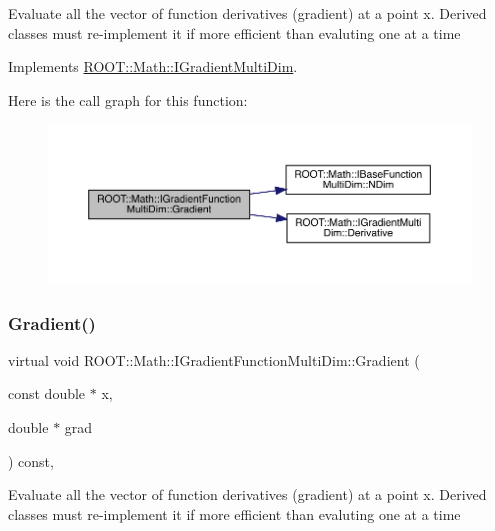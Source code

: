 Evaluate all the vector of function derivatives (gradient) at a point x. Derived classes must re-\/implement it if more efficient than evaluting one at a time 

Implements \mbox{\hyperlink{classROOT_1_1Math_1_1IGradientMultiDim_ac5785e2df4fa36061bf9ddbb9ce4dde0}{R\+O\+O\+T\+::\+Math\+::\+I\+Gradient\+Multi\+Dim}}.

Here is the call graph for this function\+:
\nopagebreak
\begin{figure}[H]
\begin{center}
\leavevmode
\includegraphics[width=350pt]{da/d1a/classROOT_1_1Math_1_1IGradientFunctionMultiDim_ab65a713d2637c69b334d2119ef4f0e26_cgraph}
\end{center}
\end{figure}
\mbox{\label{classROOT_1_1Math_1_1IGradientFunctionMultiDim_ab65a713d2637c69b334d2119ef4f0e26}} 
\subsubsection{\texorpdfstring{Gradient()}{Gradient()}\hspace{0.1cm}{\footnotesize\ttfamily [3/3]}}
{\footnotesize\ttfamily virtual void R\+O\+O\+T\+::\+Math\+::\+I\+Gradient\+Function\+Multi\+Dim\+::\+Gradient (\begin{DoxyParamCaption}\item[{const double $\ast$}]{x,  }\item[{double $\ast$}]{grad }\end{DoxyParamCaption}) const\hspace{0.3cm}{\ttfamily [inline]}, {\ttfamily [virtual]}}

Evaluate all the vector of function derivatives (gradient) at a point x. Derived classes must re-\/implement it if more efficient than evaluting one at a time 

